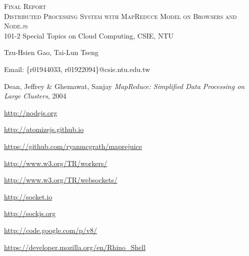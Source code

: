 \documentclass[a4paper, 10pt]{article}
\begin{document}
\begin{center}
\begin{spacing}{2}
\textsc{\LARGE Final Report}\\[1.5cm]
\textsc{\LARGE Distributed Processing System with MapReduce Model on Browsers and Node.js}\\[2cm]
101-2 Special Topics on Cloud Computing, CSIE, NTU

Tzu-Hsien Gao, Tai-Lun Tseng

Email: \{r01944033, r01922094\}@csie.ntu.edu.tw
\end{spacing}
\end{center}








\begin{thebibliography}{9}

Dean, Jeffrey \& Ghemawat, Sanjay
\emph{MapReduce: Simplified Data Processing on Large Clusters},
2004

\url{http://nodejs.org}

\url{http://atomizejs.github.io}

\url{https://github.com/ryanmcgrath/maprejuice}

\url{http://www.w3.org/TR/workers/}

\url{http://www.w3.org/TR/websockets/}

\url{http://socket.io}

\url{http://sockjs.org}

\url{http://code.google.com/p/v8/}

\url{https://developer.mozilla.org/en/Rhino_Shell}

\end{thebibliography}
\end{document}
